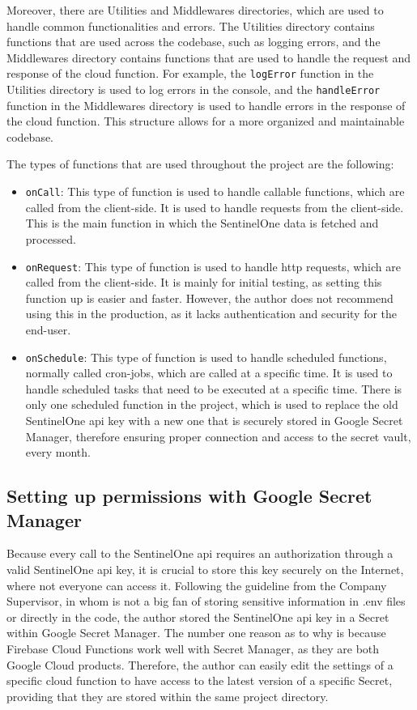 \begin{multicols}{2}
  Moreover, there are Utilities and Middlewares directories, which are used to handle common functionalities and errors. The Utilities
  directory contains functions that are used across the codebase, such as logging errors, and the Middlewares directory contains functions
  that are used to handle the request and response of the cloud function. For example, the \texttt{logError} function in the Utilities
  directory is used to log errors in the console, and the \texttt{handleError} function in the Middlewares directory is used to handle
  errors in the response of the cloud function. This structure allows for a more organized and maintainable codebase.

  The types of functions that are used throughout the project are the following:
  \begin{itemize}
    \item \texttt{onCall}: This type of function is used to handle callable functions, which are called from the client-side. It is used
          to handle requests from the client-side. This is the main function in which the SentinelOne data is fetched and processed.
    \item \texttt{onRequest}: This type of function is used to handle \acrshort{http} requests, which are called from the client-side.
          It is mainly for initial testing, as setting this function up is easier and faster. However, the author does not recommend
          using this in the production, as it lacks authentication and security for the end-user.
    \item \texttt{onSchedule}: This type of function is used to handle scheduled functions, normally called cron-jobs, which are called
          at a specific time. It is used to handle scheduled tasks that need to be executed at a specific time. There is only one
          scheduled function in the project, which is used to replace the old SentinelOne \acrshort{api} key with a new one that is
          securely stored in Google Secret Manager, therefore ensuring proper connection and access to the secret vault, every month.
  \end{itemize}

  \subsection{Setting up permissions with Google Secret Manager}

  Because every call to the SentinelOne \acrshort{api} requires an authorization through a valid SentinelOne \acrshort{api} key, it is
  crucial to store this key securely on the Internet, where not everyone can access it. Following the guideline from the Company
  Supervisor, in whom is not a big fan of storing sensitive information in .env files or directly in the code, the author stored the
  SentinelOne \acrshort{api} key in a Secret within Google Secret Manager. The number one reason as to why is because Firebase Cloud
  Functions work well with Secret Manager, as they are both Google Cloud products. Therefore, the author can easily edit the settings of
  a specific cloud function to have access to the latest version of a specific Secret, providing that they are stored within the same
  project directory.


\end{multicols}
